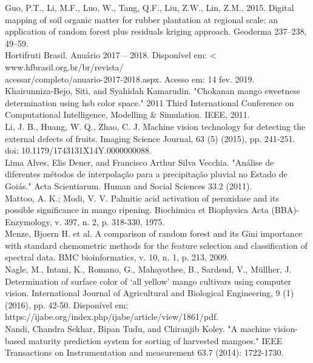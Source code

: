 \noindent Guo, P.T., Li, M.F., Luo, W., Tang, Q.F., Liu, Z.W., Lin, Z.M., 2015. Digital mapping of soil organic matter for rubber plantation at regional scale: an application of random forest
plus residuals kriging approach. Geoderma 237–238, 49–59.
\\

\noindent Hortifruti Brasil. Anuário 2017 – 2018. Disponível em: <
www.hfbrasil.org.br/br/revista/ \\
acessar/completo/anuario-2017-2018.aspx. Acesso em: 14 fev. 2019.
\\

\noindent Khairunniza-Bejo, Siti, and Syahidah Kamarudin. "Chokanan mango sweetness determination using hsb color space." 2011 Third International Conference on Computational Intelligence, Modelling & Simulation. IEEE, 2011.
\\

\noindent Li, J. B., Huang, W. Q., Zhao, C. J. Machine vision technology for detecting the external defects of fruits. Imaging Science Journal, 63 (5) (2015), pp. 241-251. doi: 10.1179/1743131X14Y.0000000088.
\\

\noindent Lima Alves, Elis Dener, and Francisco Arthur Silva Vecchia. "Análise de diferentes métodos de interpolação para a precipitação pluvial no Estado de Goiás." Acta Scientiarum. Human and Social Sciences 33.2 (2011).
\\

\noindent Mattoo, A. K.; Modi, V. V. Palmitic acid activation of peroxidase and its possible significance in mango ripening. Biochimica et Biophysica Acta (BBA)-Enzymology, v. 397, n. 2, p. 318-330, 1975.
\\

\noindent Menze, Bjoern H. et al. A comparison of random forest and its Gini importance with standard chemometric methods for the feature selection and classification of spectral data. BMC bioinformatics, v. 10, n. 1, p. 213, 2009.
\\

\noindent Nagle, M., Intani, K., Romano, G., Mahayothee, B., Sardsud, V., Müllher, J. Determination of surface color of ‘all yellow’ mango cultivars using computer vision. International Journal of Agricultural and Biological Engineering, 9 (1) (2016), pp. 42-50. Disponível em: https://ijabe.org/index.php/ijabe/article/view/1861/pdf.
\\

\noindent Nandi, Chandra Sekhar, Bipan Tudu, and Chiranjib Koley. "A machine vision-based maturity prediction system for sorting of harvested mangoes." IEEE Transactions on Instrumentation and measurement 63.7 (2014): 1722-1730.
\\

